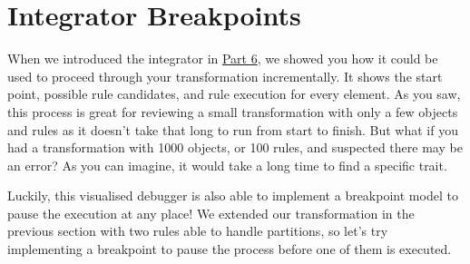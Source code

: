 \newpage
\hypertarget{sec:breakpoints}{}
\section{Integrator Breakpoints}
\genHeader

When we introduced the integrator in \hyperlink{sec:app_integrator}{Part 6}, we showed you how it could be used to proceed through your transformation
incrementally. It shows the start point, possible rule candidates, and rule execution for every element. As you saw, this process
is great for reviewing a small transformation with only a few objects and rules as it doesn't take that long to run from start to finish. But what if you had a
transformation with 1000 objects, or 100 rules, and suspected there may be an error? As you can imagine, it would take a long time to find a specific trait.

Luckily, this visualised debugger is also able to implement a breakpoint model to pause the execution at any place! We extended our transformation in
the previous section with two rules able to handle partitions, so let's try implementing a breakpoint to pause the process before one of them is executed.

